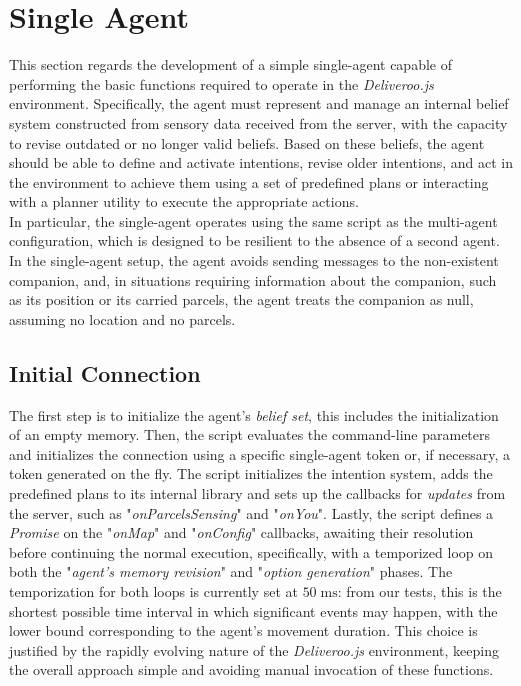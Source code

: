 
\section{Single Agent}
    This section regards the development of a simple single-agent capable of performing the basic functions required to operate in the \textit{Deliveroo.js} environment. Specifically, the agent must represent and manage an internal belief system constructed from sensory data received from the server, with the capacity to revise outdated or no longer valid beliefs. Based on these beliefs, the agent should be able to define and activate intentions, revise older intentions, and act in the environment to achieve them using a set of predefined plans or interacting with a planner utility to execute the appropriate actions.
    \medskip\\    
    In particular, the single-agent operates using the same script as the multi-agent configuration, which is designed to be resilient to the absence of a second agent. In the single-agent setup, the agent avoids sending messages to the non-existent companion, and, in situations requiring information about the companion, such as its position or its carried parcels, the agent treats the companion as null, assuming no location and no parcels.

    \subsection{Initial Connection}
        The first step is to initialize the agent's \textit{belief set}, this includes the initialization of an empty memory. Then, the script evaluates the command-line parameters and initializes the connection using a specific single-agent token or, if necessary, a token generated on the fly. The script initializes the intention system, adds the predefined plans to its internal library and sets up the callbacks for \textit{updates} from the server, such as "\textit{onParcelsSensing}" and "\textit{onYou}". Lastly, the script defines a \textit{Promise} on the "\textit{onMap}" and "\textit{onConfig}" callbacks, awaiting their resolution before continuing the normal execution, specifically, with a temporized loop on both the "\textit{agent's memory revision}" and "\textit{option generation}" phases. The temporization for both loops is currently set at $50\;\text{ms}$: from our tests, this is the shortest possible time interval in which significant events may happen, with the lower bound corresponding to the agent's movement duration. This choice is justified by the rapidly evolving nature of the \textit{Deliveroo.js} environment, keeping the overall approach simple and avoiding manual invocation of these functions.

